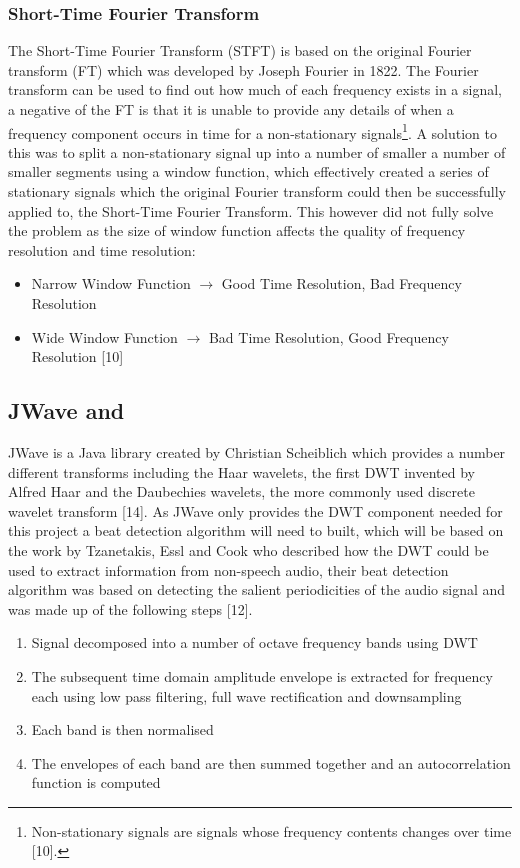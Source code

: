 \documentclass[a4paper, 11pt]{article}
\begin{document}
\subsubsection{Short-Time Fourier Transform}
The Short-Time Fourier Transform (STFT) is based on the original Fourier transform (FT) which was developed by Joseph Fourier in 1822. The Fourier transform can be used to find out how much of each frequency exists in a signal, a negative of the FT is that it is unable to provide any details of when a frequency component occurs in time for a non-stationary signals\footnote{Non-stationary signals are signals whose frequency contents changes over time [10].}. A solution to this was to split a non-stationary signal up into a number of smaller a number of smaller segments using a window function, which effectively created a series of stationary signals which the original Fourier transform could then be successfully applied to, the Short-Time Fourier Transform. This however did not fully solve the problem as the size of window function affects the quality of frequency resolution and time resolution:
\begin{itemize}
\item Narrow Window Function $\longrightarrow$  Good Time Resolution, Bad Frequency Resolution
\item Wide Window Function $\longrightarrow$  Bad Time Resolution, Good Frequency Resolution [10]
\end{itemize}

\subsection{JWave and }
JWave is a Java library created by Christian Scheiblich which provides a number different transforms including the Haar wavelets, the first DWT invented by Alfred Haar and the Daubechies wavelets, the more commonly used discrete wavelet transform [14]. As JWave only provides the DWT component needed for this project a beat detection algorithm will need to built, which will be based on the work by Tzanetakis, Essl and Cook who described how the DWT could be used to extract information from non-speech audio, their beat detection algorithm was based on detecting the salient periodicities of the audio signal and was made up of the following steps [12]. 

\begin{enumerate}
\item Signal decomposed into a number of octave frequency bands using DWT
\item The subsequent time domain amplitude envelope is extracted for frequency each using low pass filtering, full wave rectification and downsampling
\item Each band is then normalised
\item The envelopes of each band are then summed together and an autocorrelation function is computed
\end{enumerate}
\end{document}
